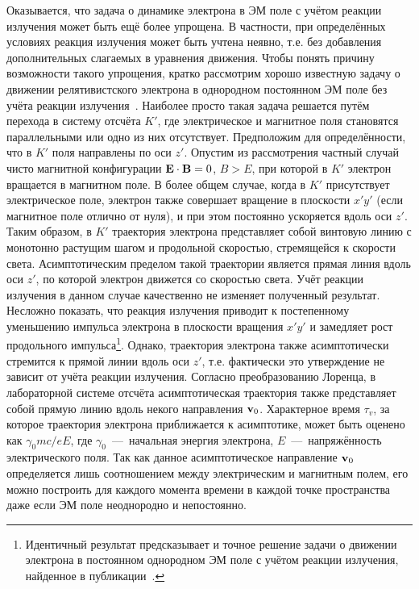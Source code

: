 Оказывается, что задача о динамике электрона в ЭМ поле с учётом реакции излучения может быть ещё более упрощена.
В частности, при определённых условиях реакция излучения может быть учтена неявно, т.е. без добавления дополнительных слагаемых в уравнения движения.
Чтобы понять причину возможности такого упрощения, кратко рассмотрим хорошо известную задачу о движении релятивистского электрона в однородном постоянном ЭМ поле без учёта реакции излучения~\cite{LandauII}.
Наиболее просто такая задача решается путём перехода в систему отсчёта $K'$, где электрическое и магнитное поля становятся параллельными или одно из них отсутствует.
Предположим для определённости, что в $K'$ поля направлены по оси $z'$.
Опустим из рассмотрения частный случай чисто магнитной конфигурации ${\vb{E} \cdot \vb{B}=0}$, $B>E$, при которой в $K'$ электрон вращается в магнитном поле.
В более общем случае, когда в $K'$ присутствует электрическое поле, электрон также совершает вращение в плоскости $x'y'$ (если магнитное поле отлично от нуля), и при этом постоянно ускоряется вдоль оси $z'$.
Таким образом, в $K'$ траектория электрона представляет собой винтовую линию с монотонно растущим шагом и продольной скоростью, стремящейся к скорости света.
Асимптотическим пределом такой траектории является прямая линия вдоль оси $z'$, по которой электрон движется со скоростью света.
Учёт реакции излучения в данном случае качественно не изменяет полученный результат.
Несложно показать, что реакция излучения приводит к постепенному уменьшению импульса электрона в плоскости вращения $x'y'$ и замедляет рост продольного импульса\footnote{Идентичный результат предсказывает и точное решение задачи о движении электрона в постоянном однородном ЭМ поле с учётом реакции излучения, найденное в публикации~\cite{heintzmann1973exact}.}.
Однако, траектория электрона также асимптотически стремится к прямой линии вдоль оси $z'$, т.е. фактически это утверждение не зависит от учёта реакции излучения.
Согласно преобразованию Лоренца, в лабораторной системе отсчёта асимптотическая траектория также представляет собой прямую линию вдоль некого направления $\vb{v}_0$.
Характерное время $\tau_v$, за которое траектория электрона приближается к асимптотике, может быть оценено как $\gamma_0 mc/eE$, где $\gamma_0$~---~начальная энергия электрона, $E$~---~напряжённость электрического поля.
Так как данное асимптотическое направление $\vb{v}_0$ определяется лишь соотношением между электрическим и магнитным полем, его можно построить для каждого момента времени в каждой точке пространства даже если ЭМ поле неоднородно и непостоянно.
